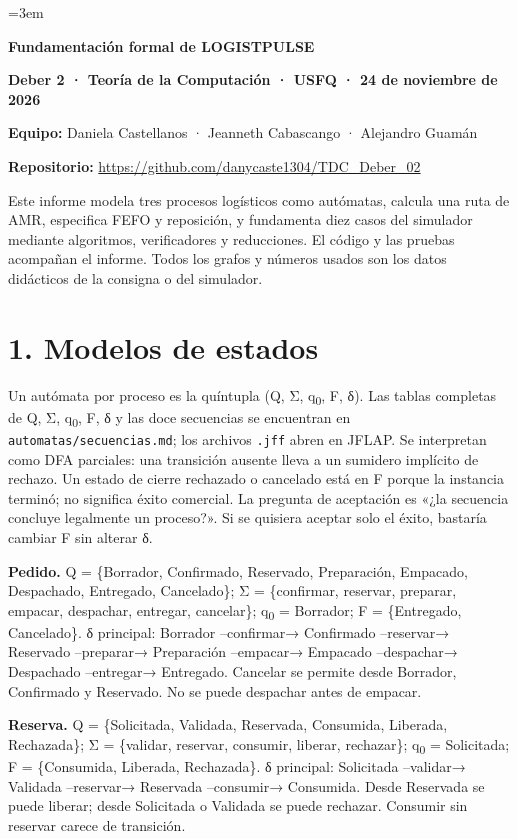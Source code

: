 \documentclass[12pt,a4paper]{article}
\begin{document}
\sloppy
\emergencystretch=3em

\begin{center}
{\Large\bfseries Fundamentación formal de LOGISTPULSE}\\[0.5em]
\end{center}

\textbf{Deber 2 · Teoría de la Computación · USFQ · 24 de noviembre de 2026}


\textbf{Equipo:} Daniela Castellanos · Jeanneth Cabascango · Alejandro Guamán


\textbf{Repositorio:} \url{https://github.com/danycaste1304/TDC_Deber_02}


Este informe modela tres procesos logísticos como autómatas, calcula una ruta de AMR, especifica FEFO y reposición, y fundamenta diez casos del simulador mediante algoritmos, verificadores y reducciones. El código y las pruebas acompañan el informe. Todos los grafos y números usados son los datos didácticos de la consigna o del simulador.


\section{1. Modelos de estados}

Un autómata por proceso es la quíntupla (Q, Σ, q\textsubscript{0}, F, δ). Las tablas completas de Q, Σ, q\textsubscript{0}, F, δ y las doce secuencias se encuentran en \texttt{automatas/secuencias.md}; los archivos \texttt{.jff} abren en JFLAP. Se interpretan como DFA parciales: una transición ausente lleva a un sumidero implícito de rechazo. Un estado de cierre rechazado o cancelado está en F porque la instancia terminó; no significa éxito comercial. La pregunta de aceptación es «¿la secuencia concluye legalmente un proceso?». Si se quisiera aceptar solo el éxito, bastaría cambiar F sin alterar δ.


\textbf{Pedido.} Q = \{Borrador, Confirmado, Reservado, Preparación, Empacado, Despachado, Entregado, Cancelado\}; Σ = \{confirmar, reservar, preparar, empacar, despachar, entregar, cancelar\}; q\textsubscript{0} = Borrador; F = \{Entregado, Cancelado\}. δ principal: Borrador --confirmar→ Confirmado --reservar→ Reservado --preparar→ Preparación --empacar→ Empacado --despachar→ Despachado --entregar→ Entregado. Cancelar se permite desde Borrador, Confirmado y Reservado. No se puede despachar antes de empacar.


\textbf{Reserva.} Q = \{Solicitada, Validada, Reservada, Consumida, Liberada, Rechazada\}; Σ = \{validar, reservar, consumir, liberar, rechazar\}; q\textsubscript{0} = Solicitada; F = \{Consumida, Liberada, Rechazada\}. δ principal: Solicitada --validar→ Validada --reservar→ Reservada --consumir→ Consumida. Desde Reservada se puede liberar; desde Solicitada o Validada se puede rechazar. Consumir sin reservar carece de transición.
\end{document}
